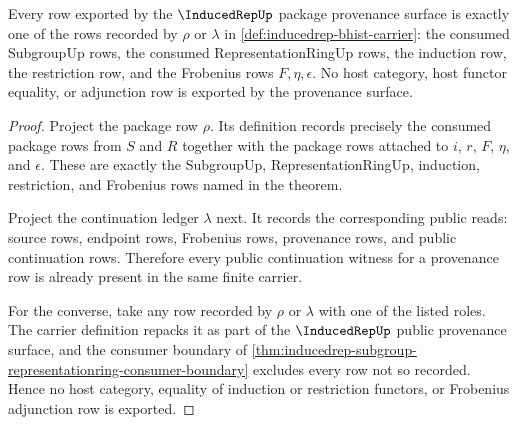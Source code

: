 \begin{theorem}
\label{thm:inducedrep-pkg-provenance-exactness}
Every row exported by the $\InducedRepUp$ package provenance surface is
exactly one of the rows recorded by $\rho$ or $\lambda$ in
\autoref{def:inducedrep-bhist-carrier}: the consumed SubgroupUp rows, the
consumed RepresentationRingUp rows, the induction row, the restriction row,
and the Frobenius rows $F,\eta,\epsilon$. No host category, host functor
equality, or adjunction row is exported by the provenance surface.
\end{theorem}
\begin{proof}
Project the package row $\rho$. Its definition records precisely the
consumed package rows from $S$ and $R$ together with the package rows
attached to $i$, $r$, $F$, $\eta$, and $\epsilon$. These are exactly the
SubgroupUp, RepresentationRingUp, induction, restriction, and Frobenius
rows named in the theorem.

Project the continuation ledger $\lambda$ next. It records the corresponding
public reads: source rows, endpoint rows, Frobenius rows, provenance rows,
and public continuation rows. Therefore every public continuation witness
for a provenance row is already present in the same finite carrier.

For the converse, take any row recorded by $\rho$ or $\lambda$ with one of
the listed roles. The carrier definition repacks it as part of the
$\InducedRepUp$ public provenance surface, and the consumer boundary of
\autoref{thm:inducedrep-subgroup-representationring-consumer-boundary}
excludes every row not so recorded. Hence no host category, equality of
induction or restriction functors, or Frobenius adjunction row is exported.
\end{proof}


